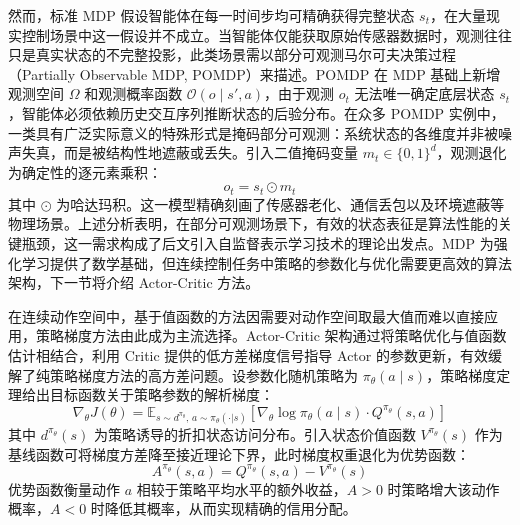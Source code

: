 然而，标准 MDP 假设智能体在每一时间步均可精确获得完整状态 $s_t$，在大量现实控制场景中这一假设并不成立。当智能体仅能获取原始传感器数据时，观测往往只是真实状态的不完整投影，此类场景需以部分可观测马尔可夫决策过程（Partially Observable MDP, POMDP）来描述。POMDP 在 MDP 基础上新增观测空间 $\Omega$ 和观测概率函数 $\mathcal{O}(o \mid s', a)$，由于观测 $o_t$ 无法唯一确定底层状态 $s_t$，智能体必须依赖历史交互序列推断状态的后验分布。在众多 POMDP 实例中，一类具有广泛实际意义的特殊形式是掩码部分可观测\cite{gu2023order}：系统状态的各维度并非被噪声失真，而是被结构性地遮蔽或丢失。引入二值掩码变量 $m_t \in \{0, 1\}^d$，观测退化为确定性的逐元素乘积：
\begin{equation}
    o_t = s_t \odot m_t
\end{equation}
其中 $\odot$ 为哈达玛积。这一模型精确刻画了传感器老化、通信丢包以及环境遮蔽等物理场景。上述分析表明，在部分可观测场景下，有效的状态表征是算法性能的关键瓶颈，这一需求构成了后文引入自监督表示学习技术的理论出发点。MDP 为强化学习提供了数学基础，但连续控制任务中策略的参数化与优化需要更高效的算法架构，下一节将介绍 Actor-Critic 方法。


在连续动作空间中，基于值函数的方法因需要对动作空间取最大值而难以直接应用，策略梯度方法由此成为主流选择。Actor-Critic 架构通过将策略优化与值函数估计相结合，利用 Critic 提供的低方差梯度信号指导 Actor 的参数更新，有效缓解了纯策略梯度方法的高方差问题。设参数化随机策略为 $\pi_\theta(a \mid s)$，策略梯度定理给出目标函数关于策略参数的解析梯度：
\begin{equation}
    \nabla_\theta J(\theta) = \mathbb{E}_{s \sim d^{\pi_\theta},\, a \sim \pi_\theta(\cdot|s)} \left[ \nabla_\theta \log \pi_\theta(a \mid s) \cdot Q^{\pi_\theta}(s, a) \right]
\end{equation}
其中 $d^{\pi_\theta}(s)$ 为策略诱导的折扣状态访问分布。引入状态价值函数 $V^{\pi_\theta}(s)$ 作为基线函数可将梯度方差降至接近理论下界，此时梯度权重退化为优势函数：
\begin{equation}
    A^{\pi_\theta}(s, a) = Q^{\pi_\theta}(s, a) - V^{\pi_\theta}(s)
\end{equation}
优势函数衡量动作 $a$ 相较于策略平均水平的额外收益，$A > 0$ 时策略增大该动作概率，$A < 0$ 时降低其概率，从而实现精确的信用分配。


